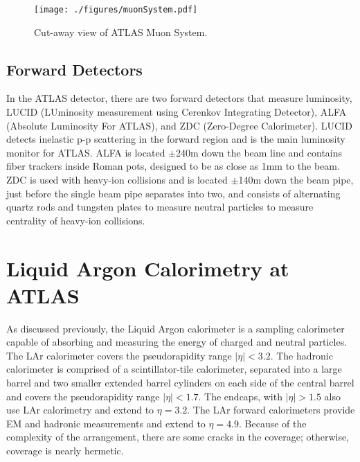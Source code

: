 \begin{figure}[h!]
  \centering
	\texttt{[image: ./figures/muonSystem.pdf]}
\caption{\label{fig:muonCutAway}{ Cut-away view of ATLAS Muon System. }} %
\end{figure}

%


  

\subsection{Forward Detectors}

In the ATLAS detector, there are two forward detectors that measure luminosity, LUCID (LUminosity measurement using Cerenkov Integrating Detector), ALFA (Absolute Luminosity For ATLAS), and ZDC (Zero-Degree Calorimeter).  LUCID detects inelastic p-p scattering in the forward region and is the main luminosity monitor for ATLAS.  ALFA is located $\pm$240m down the beam line and contains fiber trackers inside Roman pots, designed to be as close as 1mm to the beam.  ZDC is used with heavy-ion collisions and is located $\pm$140m down the beam pipe, just before the single beam pipe separates into two, and consists of alternating quartz rods and tungsten plates to measure neutral particles to measure centrality of heavy-ion collisions.\\

\section{Liquid Argon Calorimetry at ATLAS}

As discussed previously, the Liquid Argon calorimeter is a sampling calorimeter capable of absorbing and measuring the energy of charged and neutral particles.  The LAr calorimeter covers the pseudorapidity range $|\eta| < 3.2$.  The hadronic calorimeter is comprised of a scintillator-tile calorimeter, separated into a large barrel and two smaller extended barrel cylinders on each side of the central barrel and covers the pseudorapidity range $|\eta| < 1.7$.  The endcaps, with $|\eta| > 1.5$ also use LAr calorimetry and extend to $\eta = 3.2$.  The LAr forward calorimeters provide EM and hadronic measurements and extend to $\eta = 4.9$.  Because of the complexity of the arrangement, there are some cracks in the coverage; otherwise, coverage is nearly hermetic.  \\

